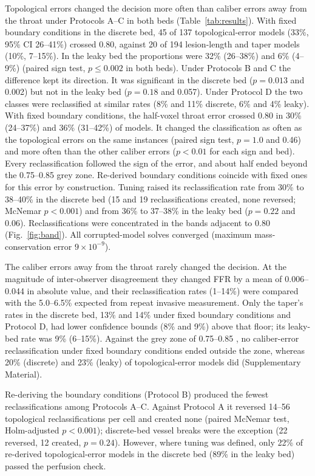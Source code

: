 \documentclass[journal,twoside,web]{ieeecolor}
\begin{document}
Topological errors changed the decision more often than caliber errors away from the throat under Protocols A--C in both beds
(Table~\ref{tab:results}). With fixed boundary conditions in the discrete bed, 45 of 137 topological-error models
(33\%, 95\% CI 26--41\%) crossed 0.80, against 20 of 194 lesion-length and taper models (10\%, 7--15\%). In the leaky bed the
proportions were 32\% (26--38\%) and 6\% (4--9\%) (paired sign test, $p \leq 0.002$ in both beds). Under
Protocols B and C the difference kept its direction. It was significant in the discrete bed
($p = 0.013$ and 0.002) but not in the leaky bed ($p = 0.18$ and 0.057). Under Protocol D the two classes
were reclassified at similar rates (8\% and 11\% discrete, 6\% and 4\% leaky). With fixed boundary conditions, the half-voxel throat error crossed 0.80 in 30\% (24--37\%) and 36\% (31--42\%) of models. It changed the classification as often as the topological errors on the same instances (paired sign test, $p = 1.0$ and 0.46) and more often than the other caliber errors ($p < 0.01$ for each sign and bed). Every reclassification followed the sign of the error, and about half ended beyond the 0.75--0.85 grey zone. Re-derived boundary conditions coincide with fixed ones for this error by construction. Tuning raised its reclassification rate from 30\% to 38--40\% in the discrete bed (15 and 19 reclassifications created, none reversed; McNemar $p < 0.001$) and from 36\% to 37--38\% in the leaky bed ($p = 0.22$ and 0.06). Reclassifications were concentrated in the bands adjacent to 0.80 (Fig.~\ref{fig:band}). All corrupted-model solves converged (maximum mass-conservation error $9\times10^{-9}$).

The caliber errors away from the throat rarely changed the decision. At the magnitude of inter-observer disagreement they changed FFR by
a mean of 0.006--0.044 in absolute value, and their reclassification rates (1--14\%) were compared with the 5.0--6.5\% expected from repeat invasive measurement. Only the taper's rates in the discrete bed, 13\% and 14\% under fixed boundary conditions and Protocol D, had lower confidence bounds (8\% and 9\%) above that floor; its leaky-bed rate was 9\% (6--15\%). Against the grey zone of 0.75--0.85 \cite{petraco2013}, no caliber-error reclassification under fixed boundary conditions
ended outside the zone, whereas 20\% (discrete) and 23\% (leaky) of topological-error models did (Supplementary Material).

Re-deriving the boundary conditions (Protocol B) produced the fewest reclassifications among Protocols A--C. Against Protocol A it reversed 14--56
topological reclassifications per cell and created none (paired McNemar test, Holm-adjusted $p < 0.001$); discrete-bed vessel
breaks were the exception (22 reversed, 12 created, $p = 0.24$). However, where tuning was defined, only 22\% of re-derived topological-error models in the discrete bed (89\% in the leaky bed) passed the perfusion check.
\end{document}
